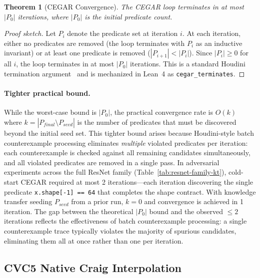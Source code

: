 \documentclass[11pt]{article}
\newtheorem{theorem}{Theorem}
\begin{document}
\begin{theorem}[CEGAR Convergence]\label{thm:cegar-converge}
The CEGAR loop terminates in at most $|P_0|$ iterations, where
$|P_0|$ is the initial predicate count.
\end{theorem}

\begin{proof}[Proof sketch]
Let $P_i$ denote the predicate set at iteration $i$.  At each iteration,
either no predicates are removed (the loop terminates with $P_i$ as an
inductive invariant) or at least one predicate is removed ($|P_{i+1}| <
|P_i|$).  Since $|P_i| \geq 0$ for all $i$, the loop terminates in at
most $|P_0|$ iterations.  This is a standard Houdini termination
argument~\cite{flanagan01} and is mechanized in Lean~4 as
\texttt{cegar\_terminates}.
\end{proof}

\paragraph{Tighter practical bound.}
While the worst-case bound is $|P_0|$, the practical convergence rate is
$O(k)$ where $k = |P_{\mathit{final}} \setminus P_{\mathit{seed}}|$
is the number of predicates that must be discovered beyond the initial
seed set.  This tighter bound arises because Houdini-style batch
counterexample processing eliminates \emph{multiple} violated
predicates per iteration: each counterexample is checked against
all remaining candidates simultaneously, and all violated predicates
are removed in a single pass.
In adversarial experiments across the full ResNet family
(Table~\ref{tab:resnet-family-kt}), cold-start CEGAR
required at most 2 iterations---each iteration discovering the
single predicate \texttt{x.shape[-1] == 64} that completes the
shape contract.  With knowledge transfer seeding
$P_{\mathit{seed}}$ from a prior run, $k = 0$ and convergence
is achieved in 1 iteration.  The gap between the theoretical
$|P_0|$ bound and the observed $\leq 2$ iterations reflects the
effectiveness of batch counterexample processing: a single
counterexample trace typically violates the majority of spurious
candidates, eliminating them all at once rather than one per iteration.

\subsection{CVC5 Native Craig Interpolation}
\end{document}
